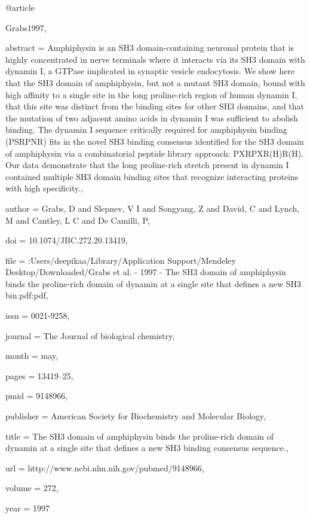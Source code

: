 @article{Grabs1997,

abstract = {Amphiphysin is an SH3 domain-containing neuronal protein that is highly concentrated in nerve terminals where it interacts via its SH3 domain with dynamin I, a GTPase implicated in synaptic vesicle endocytosis. We show here that the SH3 domain of amphiphysin, but not a mutant SH3 domain, bound with high affinity to a single site in the long proline-rich region of human dynamin I, that this site was distinct from the binding sites for other SH3 domains, and that the mutation of two adjacent amino acids in dynamin I was sufficient to abolish binding. The dynamin I sequence critically required for amphiphysin binding (PSRPNR) fits in the novel SH3 binding consensus identified for the SH3 domain of amphiphysin via a combinatorial peptide library approach: PXRPXR(H)R(H). Our data demonstrate that the long proline-rich stretch present in dynamin I contained multiple SH3 domain binding sites that recognize interacting proteins with high specificity.},

author = {Grabs, D and Slepnev, V I and Songyang, Z and David, C and Lynch, M and Cantley, L C and {De Camilli}, P},

doi = {10.1074/JBC.272.20.13419},

file = {:Users/deepikaa/Library/Application Support/Mendeley Desktop/Downloaded/Grabs et al. - 1997 - The SH3 domain of amphiphysin binds the proline-rich domain of dynamin at a single site that defines a new SH3 bin.pdf:pdf},

issn = {0021-9258},

journal = {The Journal of biological chemistry},

month = {may},

pages = {13419--25},

pmid = {9148966},

publisher = {American Society for Biochemistry and Molecular Biology},

title = {{The SH3 domain of amphiphysin binds the proline-rich domain of dynamin at a single site that defines a new SH3 binding consensus sequence.}},

url = {http://www.ncbi.nlm.nih.gov/pubmed/9148966},

volume = {272},

year = {1997}

}

